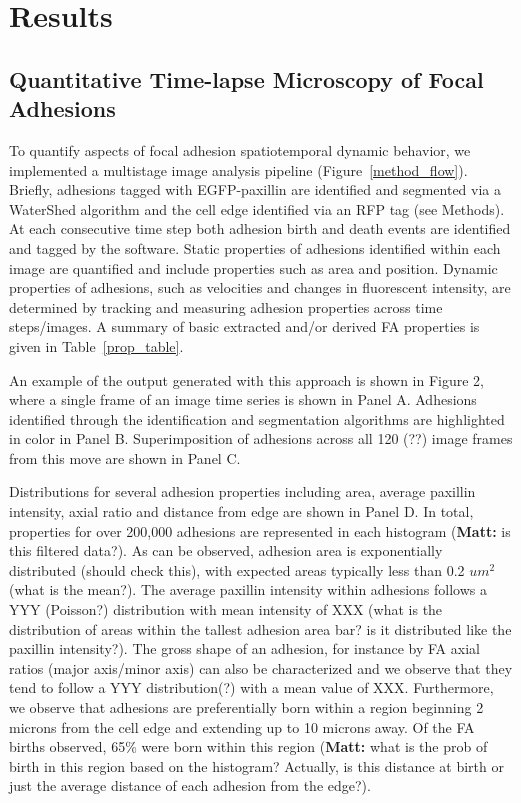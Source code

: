\documentclass[10pt]{article}
\begin{document}
\section*{Results}


\subsection*{Quantitative Time-lapse Microscopy of Focal Adhesions}

To quantify aspects of focal adhesion spatiotemporal dynamic behavior, we implemented a multistage image analysis pipeline (Figure~\ref{method_flow}). Briefly, adhesions tagged with EGFP-paxillin are identified and segmented via a WaterShed algorithm and the cell edge identified via an RFP tag (see Methods). At each consecutive time step both adhesion birth and death events are identified and tagged by the software. Static properties of adhesions identified within each image are quantified and include properties such as area and position. Dynamic properties of adhesions, such as velocities and changes in fluorescent intensity, are determined by tracking and measuring adhesion properties across time steps/images. A summary of basic extracted and/or derived FA properties is given in Table~\ref{prop_table}.

An example of the output generated with this approach is shown in Figure 2, where a single frame of an image time series is shown in Panel A. Adhesions identified through the identification and segmentation algorithms are highlighted in color in Panel B. Superimposition of adhesions across all 120 (??) image frames from this move are shown in Panel C.    

Distributions for several adhesion properties including area, average paxillin intensity, axial ratio and distance from edge are shown in Panel D. In total, properties for over 200,000 adhesions are represented in each histogram (\textbf{Matt:} is this filtered data?). As can be observed, adhesion area is exponentially distributed (should check this), with expected areas typically less than 0.2 $um^2$ (what is the mean?). The average paxillin intensity within adhesions follows a YYY (Poisson?) distribution with mean intensity of XXX (what is the distribution of areas within the tallest adhesion area bar? is it distributed like the paxillin intensity?). The gross shape of an adhesion, for instance by FA axial ratios (major axis/minor axis) can also be characterized and we observe that they tend to follow a YYY distribution(?) with a mean value of XXX. Furthermore, we observe that adhesions are preferentially born within a region beginning 2 microns from the cell edge and extending up to 10 microns away. Of the FA births observed, 65\% were born within this region (\textbf{Matt:} what is the prob of birth in this region based on the histogram? Actually, is this distance at birth or just the average distance of each adhesion from the edge?).
\end{document}
